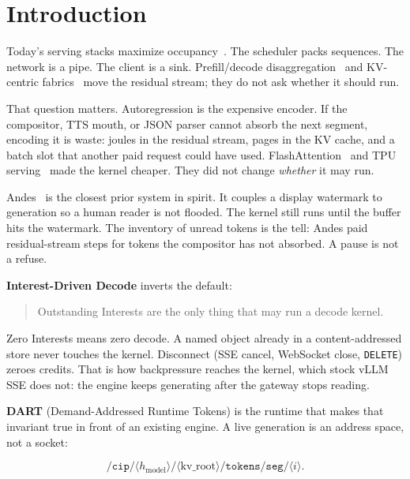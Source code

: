 \documentclass{article}
\theoremstyle{definition}
\begin{document}

\section{Introduction}
\label{sec:intro}

Today's serving stacks maximize occupancy~\citep{kwon2023vllm,yu2022orca,agrawal2024sarathi,hao2024fastserve}.
The scheduler packs sequences.
The network is a pipe.
The client is a sink.
Prefill/decode disaggregation~\citep{zhong2024distserve,patel2024splitwise} and KV-centric fabrics~\citep{qin2024mooncake,lmcache2024,sun2024llumnix} move the residual stream; they do not ask whether it should run.

That question matters.
Autoregression is the expensive encoder.
If the compositor, TTS mouth, or JSON parser cannot absorb the next segment, encoding it is waste: joules in the residual stream, pages in the KV cache, and a batch slot that another paid request could have used.
FlashAttention~\citep{dao2022flashattention} and TPU serving~\citep{pope2023efficiently} made the kernel cheaper.
They did not change \emph{whether} it may run.

Andes~\citep{liu2024andes} is the closest prior system in spirit.
It couples a display watermark to generation so a human reader is not flooded.
The kernel still runs until the buffer hits the watermark.
The inventory of unread tokens is the tell: Andes paid residual-stream steps for tokens the compositor has not absorbed.
A pause is not a refuse.

\textbf{Interest-Driven Decode} inverts the default:

\begin{quote}
Outstanding Interests are the only thing that may run a decode kernel.
\end{quote}

Zero Interests means zero decode.
A named object already in a content-addressed store never touches the kernel.
Disconnect (SSE cancel, WebSocket close, \texttt{DELETE}) zeroes credits.
That is how backpressure reaches the kernel, which stock vLLM SSE does not: the engine keeps generating after the gateway stops reading.

\textbf{DART} (Demand-Addressed Runtime Tokens) is the runtime that makes that invariant true in front of an existing engine.
A live generation is an address space, not a socket:

\begin{equation}
\texttt{/cip/}\langle h_{\mathrm{model}}\rangle\texttt{/}\langle \mathrm{kv\_root}\rangle\texttt{/tokens/seg/}\langle i\rangle.
\label{eq:name}
\end{equation}
\end{document}
